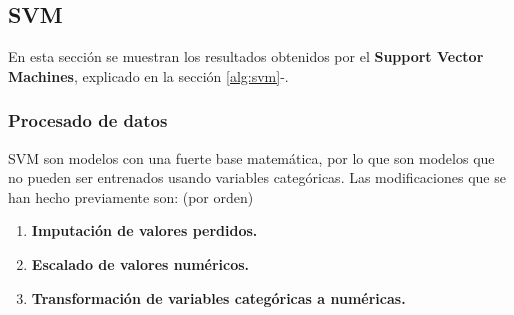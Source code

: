 \subsection{SVM}
En esta sección se muestran los resultados obtenidos por el \textbf{Support Vector Machines}, explicado en la sección \ref{alg:svm}-.
\subsubsection*{Procesado de datos}
SVM son modelos con una fuerte base matemática, por lo que son modelos que no pueden ser entrenados usando variables categóricas.
Las modificaciones que se han hecho previamente son: (por orden)
\begin{enumerate}
	\item \textbf{Imputación de valores perdidos.}
	\item \textbf{Escalado de valores numéricos.}
	\item \textbf{Transformación de variables categóricas a numéricas.}
\end{enumerate}

